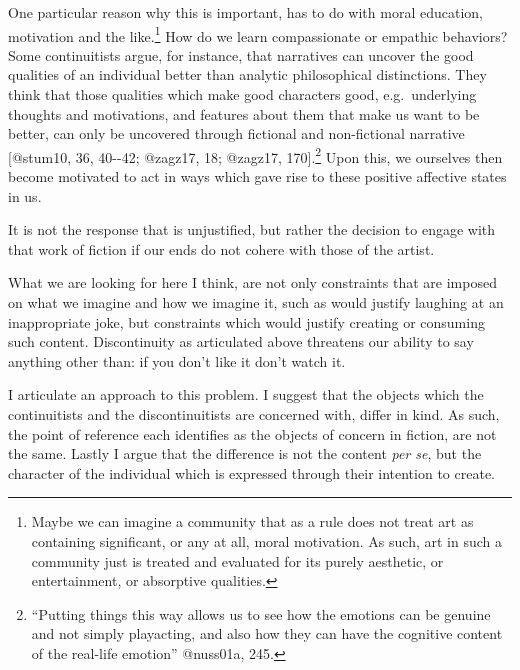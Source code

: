 \documentclass[
  letterpaper,
  DIV=11,
  numbers=noendperiod]{scrartcl}
\theoremstyle{remark}
\begin{document}
One particular reason why this is important, has to do with moral
education, motivation and the like.\footnote{Maybe we can imagine a
  community that as a rule does not treat art as containing significant,
  or any at all, moral motivation. As such, art in such a community just
  is treated and evaluated for its purely aesthetic, or entertainment,
  or absorptive qualities.} How do we learn compassionate or empathic
behaviors? Some continuitists argue, for instance, that narratives can
uncover the good qualities of an individual better than analytic
philosophical distinctions. They think that those qualities which make
good characters good, e.g.~underlying thoughts and motivations, and
features about them that make us want to be better, can only be
uncovered through fictional and non-fictional narrative {[}@stum10, 36,
40-\/-42; @zagz17, 18; @zagz17, 170{]}.\footnote{``Putting things this
  way allows us to see how the emotions can be genuine and not simply
  playacting, and also how they can have the cognitive content of the
  real-life emotion'' @nuss01a, 245.} Upon this, we ourselves then
become motivated to act in ways which gave rise to these positive
affective states in us.

It is not the response that is unjustified, but rather the decision to
engage with that work of fiction if our ends do not cohere with those of
the artist.

What we are looking for here I think, are not only constraints that are
imposed on what we imagine and how we imagine it, such as would justify
laughing at an inappropriate joke, but constraints which would justify
creating or consuming such content. Discontinuity as articulated above
threatens our ability to say anything other than: if you don't like it
don't watch it.

I articulate an approach to this problem. I suggest that the objects
which the continuitists and the discontinuitists are concerned with,
differ in kind. As such, the point of reference each identifies as the
objects of concern in fiction, are not the same. Lastly I argue that the
difference is not the content \emph{per se}, but the character of the
individual which is expressed through their intention to create.
\end{document}
